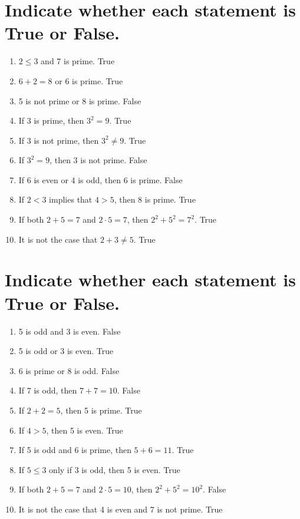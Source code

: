 \documentclass[11pt]{article} %
\begin{document}
\section{Indicate whether each statement is True or False.}
\begin{enumerate}
	\item $2 \leq 3$ and 7 is prime.
	\subitem True
	\item $6+2=8$ or 6 is prime.
	\subitem True
	\item 5 is not prime or 8 is prime.
	\subitem False
	\item If 3 is prime, then $3^2=9$.
	\subitem True
	\item If 3 is not prime, then $3^2 \neq 9$.
	\subitem True
	\item If $3^2 = 9$, then 3 is not prime.
	\subitem False
	\item If 6 is even or 4 is odd, then 6 is prime.
	\subitem False
	\item If $2<3$ implies that $4>5$, then 8 is prime.
	\subitem True
	\item If both $2+5=7$ and $2\cdot5=7$, then $2^2 + 5^2 = 7^2$.
	\subitem True
	\item It is not the case that $2+3\neq5$.
	\subitem True
\end{enumerate}

\section{Indicate whether each statement is True or False.}
\begin{enumerate}
	\item 5 is odd and 3 is even.
	\subitem False
	\item 5 is odd or 3 is even.
	\subitem True
	\item 6 is prime or 8 is odd.
	\subitem False
	\item If 7 is odd, then $7+7=10$.
	\subitem False
	\item If $2+2=5$, then 5 is prime.
	\subitem True
	\item If $4>5$, then 5 is even.
	\subitem True
	\item If 5 is odd and 6 is prime, then $5+6=11$.
	\subitem True
	\item If $5\leq3$ only if 3 is odd, then 5 is even.
	\subitem True
	\item If both $2+5=7$ and $2\cdot5=10$, then $2^2+5^2=10^2$.
	\subitem False
	\item It is not the case that 4 is even and 7 is not prime.
	\subitem True
\end{enumerate}
\end{document}
